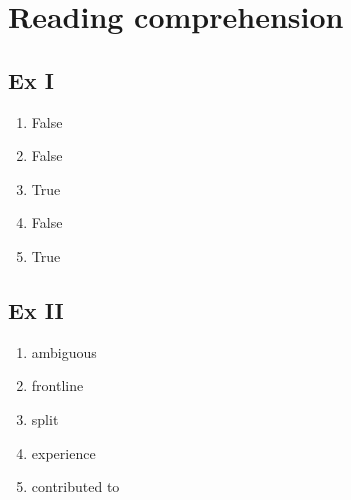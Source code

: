 \documentclass{article}
\begin{document}
    \section*{Reading comprehension}
        \subsection*{Ex I}
        \begin{enumerate}
            \item False
            \item False
            \item True
            \item False
            \item True
        \end{enumerate}
        \subsection*{Ex II}
        \begin{enumerate}
            \item ambiguous
            \item frontline
            \item split
            \item experience
            \item contributed to
        \end{enumerate}
\end{document}
